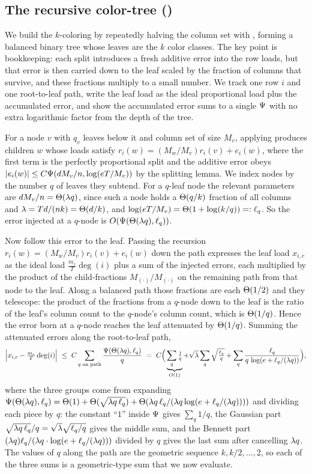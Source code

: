 \subsection{The recursive color-tree ()}\label{app:tree-full}

We build the $k$-coloring by repeatedly halving the column set with , forming a balanced binary tree whose
leaves are the $k$ color classes. The key point is bookkeeping: each split introduces a fresh additive error into the row
loads, but that error is then carried down to the leaf scaled by the fraction of columns that survive, and these fractions
multiply to a small number. We track one row $i$ and one root-to-leaf path, write the leaf load as the ideal proportional
load plus the accumulated error, and show the accumulated error sums to a single $\Psi$ with no extra logarithmic factor
from the depth of the tree.

For a node $v$ with $q_v$ leaves below it and column set of size $M_v$, applying  produces children $w$
whose loads satisfy $r_i(w)=(M_w/M_v)r_i(v)+e_i(w)$, where the first term is the perfectly proportional split and the
additive error obeys $|e_i(w)|\le C\Psi(dM_v/n,\log(eT/M_v))$ by the splitting lemma. We index nodes by the number $q$ of
leaves they subtend. For a $q$-leaf node the relevant parameters are $dM_v/n=\Theta(\lambda q)$, since such a node holds a
$\Theta(q/k)$ fraction of all columns and $\lambda=Td/(nk)=\Theta(d/k)$, and $\log(eT/M_v)=\Theta(1+\log(k/q))=:\ell_q$. So the error
injected at a $q$-node is $O(\Psi(\Theta(\lambda q),\ell_q))$.

Now follow this error to the leaf. Passing the recursion $r_i(w)=(M_w/M_v)r_i(v)+e_i(w)$ down the path expresses the leaf
load $x_{i,c}$ as the ideal load $\tfrac{m_c}{T}\deg(i)$ plus a sum of the injected errors, each multiplied by the product
of the child-fractions $M_{(\cdot)}/M_{(\cdot)}$ on the remaining path from that node to the leaf. Along a balanced path
those fractions are each $\Theta(1/2)$ and they telescope: the product of the fractions from a $q$-node down to the leaf is the
ratio of the leaf's column count to the $q$-node's column count, which is $\Theta(1/q)$. Hence the error born at a $q$-node
reaches the leaf attenuated by $\Theta(1/q)$. Summing the attenuated errors along the root-to-leaf path,
\[
  \Big|x_{i,c}-\tfrac{m_c}{T}\deg(i)\Big|\ \le\ C\sum_{q\text{ on path}}\frac{\Psifn(\Th(\lam q),\ell_q)}{q}
  \ =\ C\Big(\underbrace{\sum_q\tfrac1q}_{\Oh(1)}+\sqrt\lam\sum_q\sqrt{\tfrac{\ell_q}{q}}+\sum_q\frac{\ell_q}{q\,\log(e+\ell_q/(\lam q))}\Big),
\]
where the three groups come from expanding $\Psi(\Theta(\lambda q),\ell_q)=\Theta(1)+\Theta(\sqrt{\lambda q\,\ell_q})+\Theta(\lambda
q\,\ell_q/(\lambda q\log(e+\ell_q/(\lambda q))))$ and dividing each piece by $q$: the constant ``$1$'' inside $\Psi$ gives
$\sum_q 1/q$, the Gaussian part $\sqrt{\lambda q\,\ell_q}/q=\sqrt{\lambda}\sqrt{\ell_q/q}$ gives the middle sum, and the Bennett part
$(\lambda q)\ell_q/(\lambda q\cdot\log(e+\ell_q/(\lambda q)))$ divided by $q$ gives the last sum after cancelling $\lambda q$. The
values of $q$ along the path are the geometric sequence $k,k/2,\dots,2$, so each of the three sums is a geometric-type sum
that we now evaluate.

